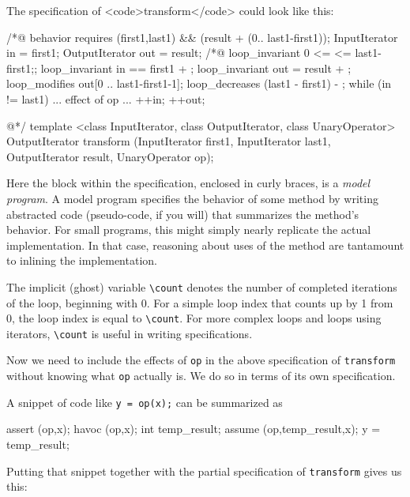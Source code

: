 The specification of <code>transform</code> could look like this:
\begin{listing-nonumber}
	/*@ behavior
	requires \valid(first1,last1) && \valid(result + (0.. last1-first1));
	{
		InputIterator in = first1; 
		OutputIterator out = result;
		/*@ 
		loop_invariant 0 <= \count <= last1-first1;; 
		loop_invariant in == first1 + \count;
		loop_invariant out = result + \count;
		loop_modifies out[0 .. last1-first1-1];
		loop_decreases (last1 - first1) - \count;
		while (in != last1) {
			... effect of op ...
			++in;
			++out;
		}	
	}
	
	@*/	
	template <class InputIterator, class OutputIterator, class UnaryOperator>
	OutputIterator transform (InputIterator first1, InputIterator last1,
	OutputIterator result, UnaryOperator op);
\end{listing-nonumber}

Here the block within the specification, enclosed in curly braces, is a \textit{model program}. 
A model program specifies the behavior of some method by
writing abstracted code (pseudo-code, if you will) that summarizes the method's behavior. 
For small programs, this might simply nearly replicate the actual implementation. 
In that case, reasoning about uses of the method are tantamount to 
inlining the implementation.

The implicit (ghost) variable \lstinline|\count| denotes the number of completed iterations of the loop, beginning with 0. 
For a simple loop index that counts up by 1 from 0, the loop index is equal to \lstinline|\count|. 
For more complex loops and loops using iterators, 
\lstinline|\count| is useful in writing specifications.

Now we need to include the effects of \lstinline|op| in the above specification of \lstinline|transform| without knowing what \lstinline|op| actually is. We do so in terms of its own specification.

A snippet of code like \lstinline|y = op(x);| can be summarized as
\begin{listing-nonumber}
	assert \pre(op,x);
	havoc \assigns(op,x);
	int temp_result;
	assume \post(op,temp_result,x);
	y = temp_result;
\end{listing-nonumber}

Putting that snippet together with the partial specification of 
\lstinline|transform| gives us this:

